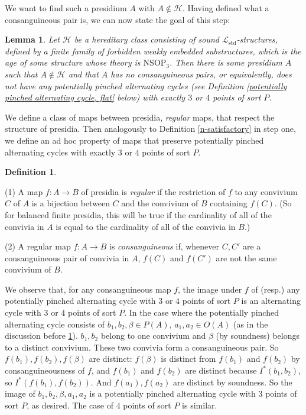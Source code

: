 \documentclass{amsart}
\newtheorem{lemma}[theorem]{Lemma}
\theoremstyle{definition}
\newtheorem{definition}[theorem]{Definition}
\theoremstyle{remark}
\numberwithin{equation}{section}
\begin{document}
We want to find such a presidium $A$ with $A \notin \mathcal{H}$. Having defined what a consanguineous pair is, we can now state the goal of this step:


\begin{lemma}
    \label{eliminating consanguineous pairs} Let $\mathcal{H}$ be a hereditary class consisting of sound $\mathcal{L}_{\mathrm{std}}$-structures, defined by a finite family of forbidden weakly embedded substructures, which is the age of some structure whose theory is $\mathrm{NSOP}_{3}$. Then there is some presidium $A$ such that $A \notin \mathcal{H}$ and that $A$ has no consanguineous pairs, or equivalently, does not have any potentially pinched alternating cycles (see Definition \ref{potentially pinched alternating cycle, flat} below) with exactly $3$ or $4$ points of sort $P$.
\end{lemma}



We define a class of maps between presidia, \textit{regular} maps, that respect the structure of presidia. Then analogously to Definition \ref{n-satisfactory} in step one, we define an ad hoc property of maps that preserve potentially pinched alternating cycles with exactly $3$ or $4$ points of sort $P$.


\begin{definition}
    \label{regular, consanguineous}

    (1) A map $f: A \to B$ of presidia is \textit{regular} if the restriction of $f$ to any convivium $C$ of $A$ is a bijection between $C$ and the convivium of $B$ containing $f(C)$. (So for balanced finite presidia, this will be true if the cardinality of all of the convivia in $A$ is equal to the cardinality of all of the convivia in $B$.) 


    (2) A regular map $f: A \to B$ is \textit{consanguineous} if, whenever $C, C'$ are a consanguineous pair of convivia in $A$, $f(C)$ and $f(C')$ are not the same convivium of $B$.
\end{definition}

We observe that, for any consanguineous map $f$, the image under $f$ of (resp.) any potentially pinched alternating cycle with $3$ or $4$ points of sort $P$ is an alternating cycle with $3$ or $4$ points of sort $P$.  In the case where the potentially pinched alternating cycle consists of $b_1, b_2, \beta \in P(A)$, $a_1, a_2 \in O(A)$ (as in the discussion before \ref{eliminating consanguineous pairs}). $b_1, b_2$ belong to one convivium and $\beta$ (by soundness) belongs to a distinct convivium. These two convivia form a consanguineous pair.  So $f(b_1), f(b_2), f(\beta)$ are distinct: $f (\beta)$ is distinct from $f(b_{1})$ and $f(b_{2})$ by consanguineousness of $f$, and $f(b_1)$ and $f(b_2)$ are distinct because $I^{*}(b_1, b_2)$, so $I^{*}(f(b_1), f(b_2))$. And $f(a_1), f(a_2)$ are distinct by soundness. So the image of $b_1, b_2, \beta, a_1, a_2 $ is a potentially pinched alternating cycle with $3$ points of sort $P$, as desired. The case of $4$ points of sort $P$ is similar.
\end{document}
